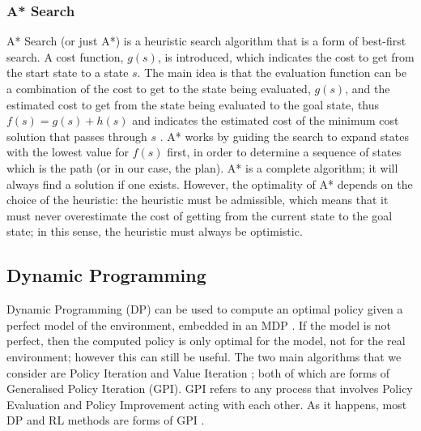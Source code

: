 \subsubsection{A* Search}
A* Search (or just A*) \cite{4082128} is a heuristic search algorithm that is a form of best-first search. A cost function, $g(s)$, is introduced, which indicates the cost to get from the start state to a state $s$. The main idea is that the evaluation function can be a combination of the cost to get to the state being evaluated, $g(s)$, and the estimated cost to get from the state being evaluated to the goal state, thus $f(s) = g(s) + h(s)$ and indicates the estimated cost of the minimum cost solution that passes through $s$ \cite{DBLP:books/aw/RN2020}. A* works by guiding the search to expand states with the lowest value for $f(s)$ first, in order to determine a sequence of states which is the path (or in our case, the plan). A* is a complete algorithm; it will always find a solution if one exists. However, the optimality of A* depends on the choice of the heuristic: the heuristic must be admissible, which means that it must never overestimate the cost of getting from the current state to the goal state; in this sense, the heuristic must always be optimistic.
\subsection{Dynamic Programming}
Dynamic Programming (DP) \cite{Bellman:1957, DBLP:books/lib/Bertsekas05} can be used to compute an optimal policy given a perfect model of the environment, embedded in an MDP \cite{Sutton1998}. If the model is not perfect, then the computed policy is only optimal for the model, not for the real environment; however this can still be useful. The two main algorithms that we consider are Policy Iteration \cite{Bellman:1957, howard:dp} and Value Iteration \cite{Bellman:1957}; both of which are forms of Generalised Policy Iteration (GPI). GPI refers to any process that involves Policy Evaluation and Policy Improvement acting with each other. As it happens, most DP and RL methods are forms of GPI \cite{Sutton1998}.
